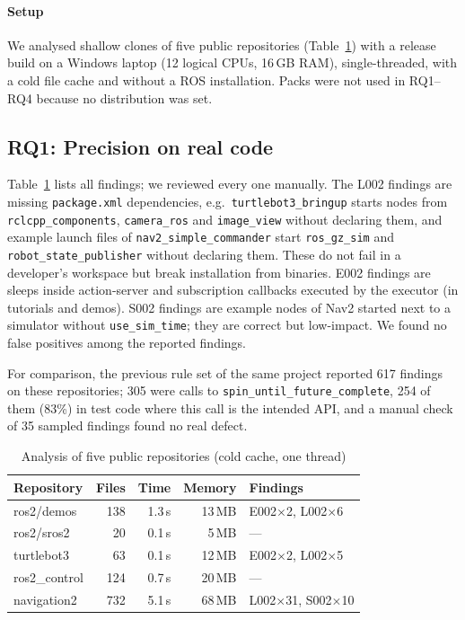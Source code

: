 ﻿\documentclass[conference]{IEEEtran}
\newcommand{\code}[1]{\texttt{#1}}
\begin{document}
\paragraph{Setup}
We analysed shallow clones of five public repositories (Table~\ref{tab:real}) with a release
build on a Windows laptop (12 logical CPUs, 16\,GB RAM), single-threaded, with a cold file cache
and without a ROS installation. Packs were not used in RQ1--RQ4 because no distribution was set.

\subsection{RQ1: Precision on real code}

Table~\ref{tab:real} lists all findings; we reviewed every one manually.
The L002 findings are missing \code{package.xml} dependencies, e.g.\
\code{turtlebot3\_bringup} starts nodes from \code{rclcpp\_components}, \code{camera\_ros}
and \code{image\_view} without declaring them, and example launch files of
\code{nav2\_simple\_commander} start \code{ros\_gz\_sim} and \code{robot\_state\_publisher}
without declaring them. These do not fail in a developer's workspace but break installation from
binaries. E002 findings are sleeps inside action-server and subscription callbacks executed by
the executor (in tutorials and demos). S002 findings are example nodes of Nav2 started next to
a simulator without \code{use\_sim\_time}; they are correct but low-impact. We found no false
positives among the reported findings.

For comparison, the previous rule set of the same project reported 617 findings on these
repositories; 305 were calls to \code{spin\_until\_future\_complete}, 254 of them (83\%) in test
code where this call is the intended API, and a manual check of 35 sampled findings found no real
defect.

\begin{table}[t]
\centering
\caption{Analysis of five public repositories (cold cache, one thread)}
\label{tab:real}
\footnotesize
\begin{tabular}{@{}lrrrl@{}}
\toprule
Repository & Files & Time & Memory & Findings\\
\midrule
ros2/demos                 & 138 & 1.3\,s &  13\,MB & E002$\times$2, L002$\times$6\\
ros2/sros2                 &  20 & 0.1\,s &   5\,MB & ---\\
turtlebot3                 &  63 & 0.1\,s &  12\,MB & E002$\times$2, L002$\times$5\\
ros2\_control              & 124 & 0.7\,s &  20\,MB & ---\\
navigation2                & 732 & 5.1\,s &  68\,MB & L002$\times$31, S002$\times$10\\
\bottomrule
\end{tabular}
\end{table}
\end{document}
